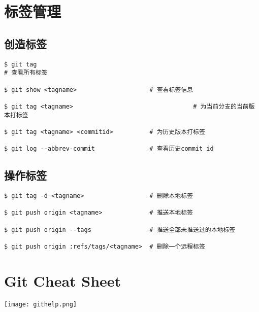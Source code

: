 \documentclass[UTF_8]{ctexart}
\begin{document}
\small
\heiti
{}


\clearpage
\section{标签管理}
\small
\heiti
{}

\subsection{创造标签}
\begin{lstlisting}[frame=shadowbox]
$ git tag															  # 查看所有标签

$ git show <tagname>                    # 查看标签信息

$ git tag <tagname>							        # 为当前分支的当前版本打标签

$ git tag <tagname> <commitid>          # 为历史版本打标签

$ git log --abbrev-commit               # 查看历史commit id
\end{lstlisting}

\subsection{操作标签}
\begin{lstlisting}[frame=shadowbox]
$ git tag -d <tagname>                  # 删除本地标签

$ git push origin <tagname>             # 推送本地标签

$ git push origin --tags                # 推送全部未推送过的本地标签

$ git push origin :refs/tags/<tagname>  # 删除一个远程标签
\end{lstlisting}

\clearpage
\section{Git Cheat Sheet}

\centering
\texttt{[image: githelp.png]}
\small
\heiti
{}
\end{document}
